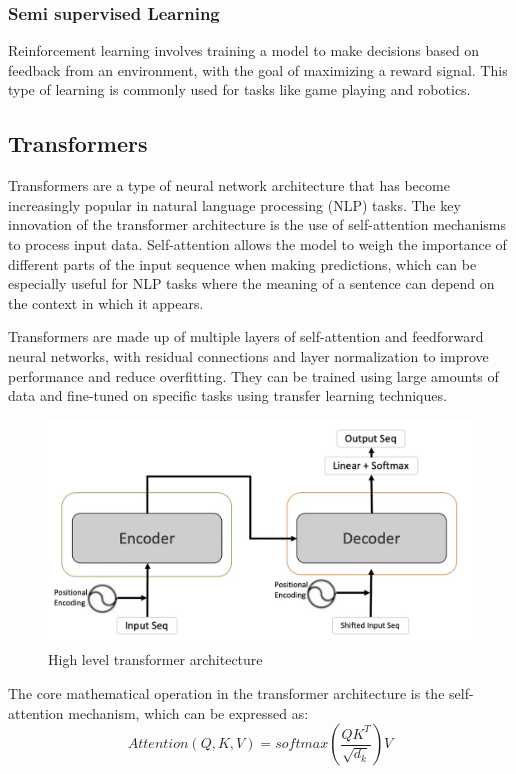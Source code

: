 \documentclass[12pt]{report}
\begin{document}
 \subsubsection*{Semi supervised Learning}
Reinforcement learning involves training a model to make decisions based on feedback from an environment, with the goal of maximizing a reward signal. This type of learning is commonly used for tasks like game playing and robotics.
 \subsection{Transformers}
 Transformers are a type of neural network architecture that has become increasingly popular in natural language processing (NLP) tasks. The key innovation of the transformer architecture is the use of self-attention mechanisms to process input data. Self-attention allows the model to weigh the importance of different parts of the input sequence when making predictions, which can be especially useful for NLP tasks where the meaning of a sentence can depend on the context in which it appears.

Transformers are made up of multiple layers of self-attention and feedforward neural networks, with residual connections and layer normalization to improve performance and reduce overfitting. They can be trained using large amounts of data and fine-tuned on specific tasks using transfer learning techniques.
\begin{figure}[h!]
    \centering
    \includegraphics[scale = 0.3]{Images/Tfer.png}
    \caption{High level transformer architecture}
    \label{fig:High level transformer architecture}
\end{figure}

The core mathematical operation in the transformer architecture is the self-attention mechanism, which can be expressed as:
\begin{equation}
    Attention(Q, K, V) = softmax(\frac{QK^T}{\sqrt{d_k}})V
\end{equation}
\end{document}

